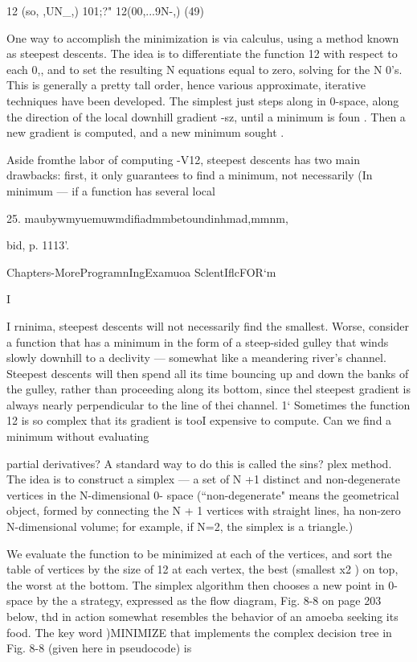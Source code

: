 {{{{{{{12 (so, ,UN_,) 101;?" 12(00,...9N-,) (49)

One way to accomplish the minimization is via calculus, using a
method known as steepest descents. The idea is to differentiate
the function 12 with respect to each 0,, and to set the resulting N
equations equal to zero, solving for the N 0’s. This is generally a
pretty tall order, hence various approximate, iterative techniques
have been developed. The simplest just steps along in 0-space,
along the direction of the local downhill gradient -sz, until a
minimum is foun . Then a new gradient is computed, and a new
minimum sought .

Aside fromthe labor of computing -V12, steepest descents has
two main drawbacks: ﬁrst, it only guarantees to ﬁnd a minimum,
not necessarily (In minimum — if a function has several local

 

25. maubywmyuemuwmdiﬁadmmbetoundinhmad,mmnm,

bid, p. 1113’.

Chapters-MoreProgramnIngExamuoa SclentIﬂcFOR‘m

I

I
rninima, steepest descents will not necessarily ﬁnd the smallest.
Worse, consider a function that has a minimum in the form of a
steep-sided gulley that winds slowly downhill to a declivity —
somewhat like a meandering river's channel. Steepest descents
will then spend all its time bouncing up and down the banks of
the gulley, rather than proceeding along its bottom, since thel
steepest gradient is always nearly perpendicular to the line of thei
channel. 1‘
Sometimes the function 12 is so complex that its gradient is tooI
expensive to compute. Can we ﬁnd a minimum without evaluating}
partial derivatives? A standard way to do this is called the sins?
plex method. The idea is to construct a simplex — a set of N +1
distinct and non-degenerate vertices in the N-dimensional 0-
space (“non-degenerate" means the geometrical object, formed
by connecting the N + 1 vertices with straight lines, ha non-zero
N-dimensional volume; for example, if N=2, the simplex is a
triangle.)

We evaluate the function to be minimized at each of the vertices,
and sort the table of vertices by the size of 12 at each vertex, the
best (smallest x2 ) on top, the worst at the bottom. The simplex
algorithm then chooses a new point in 0-space by the a strategy,
expressed as the ﬂow diagram, Fig. 8-8 on page 203 below, thd
in action somewhat resembles the behavior of an amoeba seeking
its food. The key word )MINIMIZE that implements the complex
decision tree in Fig. 8-8 (given here in pseudocode) is

}}}}}}
